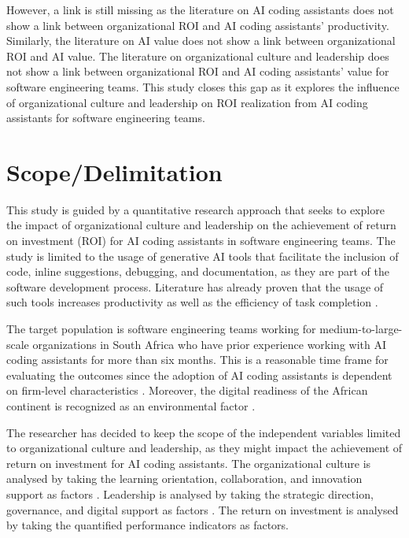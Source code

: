 \documentclass[11pt]{report}
\begin{document}
However, a link is still missing as the literature on AI coding assistants does not show a link between organizational ROI and AI coding assistants' productivity. Similarly, the literature on AI value does not show a link between organizational ROI and AI value. The literature on organizational culture and leadership does not show a link between organizational ROI and AI coding assistants' value for software engineering teams. This study closes this gap as it explores the influence of organizational culture and leadership on ROI realization from AI coding assistants for software engineering teams.

\chapter*{Scope/Delimitation}

This study is guided by a quantitative research approach that seeks to explore the impact of organizational culture and leadership on the achievement of return on investment (ROI) for AI coding assistants in software engineering teams. The study is limited to the usage of generative AI tools that facilitate the inclusion of code, inline suggestions, debugging, and documentation, as they are part of the software development process. Literature has already proven that the usage of such tools increases productivity as well as the efficiency of task completion \autocite{Brynjolfsson2025, Noy2023, Peng2023}.

The target population is software engineering teams working for medium-to-large-scale organizations in South Africa who have prior experience working with AI coding assistants for more than six months. This is a reasonable time frame for evaluating the outcomes since the adoption of AI coding assistants is dependent on firm-level characteristics \autocite{Babina2024}. Moreover, the digital readiness of the African continent is recognized as an environmental factor \autocite{Gillespie2025}.

The researcher has decided to keep the scope of the independent variables limited to organizational culture and leadership, as they might impact the achievement of return on investment for AI coding assistants. The organizational culture is analysed by taking the learning orientation, collaboration, and innovation support as factors \autocite{AbdulWahab2024, FossoWamba2024}. Leadership is analysed by taking the strategic direction, governance, and digital support as factors \autocite{An2024, Hossain2025, Murire2024}. The return on investment is analysed by taking the quantified performance indicators as factors.
\end{document}
